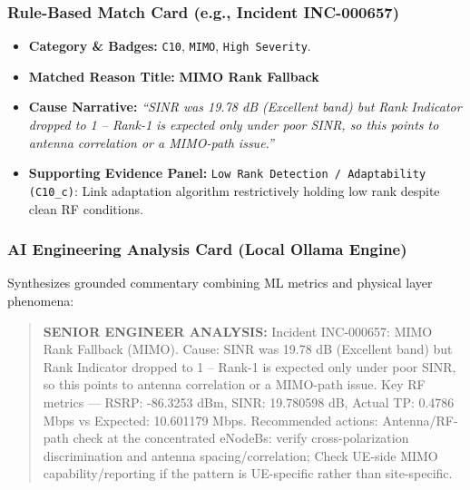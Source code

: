 \documentclass[12pt,a4paper]{article}
\begin{document}
\subsubsection{Rule-Based Match Card (e.g., Incident INC-000657)}
\begin{itemize}
    \item \textbf{Category \& Badges:} \texttt{C10}, \texttt{MIMO}, \texttt{High Severity}.
    \item \textbf{Matched Reason Title:} \textbf{MIMO Rank Fallback}
    \item \textbf{Cause Narrative:} \textit{``SINR was 19.78 dB (Excellent band) but Rank Indicator dropped to 1 -- Rank-1 is expected only under poor SINR, so this points to antenna correlation or a MIMO-path issue.''}
    \item \textbf{Supporting Evidence Panel:} \texttt{Low Rank Detection / Adaptability (C10\_c)}: Link adaptation algorithm restrictively holding low rank despite clean RF conditions.
\end{itemize}

\subsubsection{AI Engineering Analysis Card (Local Ollama Engine)}
Synthesizes grounded commentary combining ML metrics and physical layer phenomena:
\begin{quote}
\small
\textbf{SENIOR ENGINEER ANALYSIS:} Incident INC-000657: MIMO Rank Fallback (MIMO). Cause: SINR was 19.78 dB (Excellent band) but Rank Indicator dropped to 1 -- Rank-1 is expected only under poor SINR, so this points to antenna correlation or a MIMO-path issue. Key RF metrics — RSRP: -86.3253 dBm, SINR: 19.780598 dB, Actual TP: 0.4786 Mbps vs Expected: 10.601179 Mbps. Recommended actions: Antenna/RF-path check at the concentrated eNodeBs: verify cross-polarization discrimination and antenna spacing/correlation; Check UE-side MIMO capability/reporting if the pattern is UE-specific rather than site-specific.
\end{quote}
\end{document}
